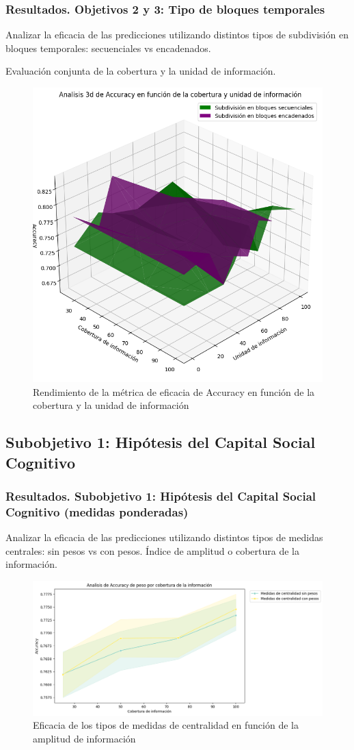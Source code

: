 \documentclass{beamer}
\begin{document}
\begin{frame}
	\frametitle{Resultados. Objetivos 2 y  3: Tipo de bloques temporales}
\begin{block}{Analizar la eficacia de las predicciones utilizando
		distintos tipos de subdivisión en bloques temporales: secuenciales vs encadenados.}

	Evaluación conjunta de la cobertura y la unidad de información.
	\end{block}	
\begin{figure}[H]
	\centering
	\includegraphics[width=0.45\linewidth]{figs/cap7/figura_18}
	\caption{Rendimiento de la métrica de eficacia de Accuracy en función de la cobertura y la unidad de información}
	
	\label{fig:figura215}
\end{figure}

	
\end{frame}


\subsection{Subobjetivo 1: Hipótesis del Capital Social Cognitivo}
\begin{frame}
	\frametitle{Resultados. Subobjetivo 1: Hipótesis del Capital Social Cognitivo (medidas ponderadas)}
	\begin{block}{Analizar la eficacia de las predicciones utilizando
			distintos tipos de medidas centrales: sin pesos vs con pesos.}
		Índice de amplitud o cobertura de la información.
	\end{block}
\begin{figure}[H]
	\centering
	\includegraphics[width=0.6\linewidth]{figs/cap7/figura_34}
	\caption{Eficacia de los tipos de medidas de centralidad en función de la amplitud de información}
	
	\label{fig:figura218}
\end{figure}


	
\end{frame}
\end{document}
